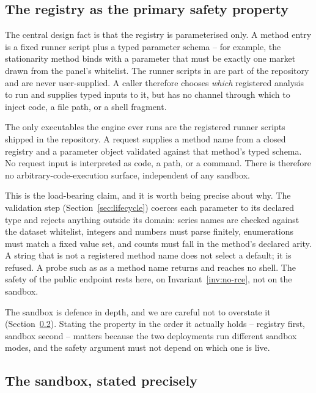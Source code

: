 \subsection{The registry as the primary safety property}
\label{sec:registry-guard}

The central design fact is that the registry is parameterised only. A method entry
is a fixed runner script plus a typed parameter schema -- for example, the
stationarity method binds  with a  parameter that must be
exactly one market drawn from the panel's whitelist. The runner scripts in
 are part of the repository and are never user-supplied. A caller therefore
chooses \emph{which} registered analysis to run and supplies typed inputs to it, but
has no channel through which to inject code, a file path, or a shell fragment.

\begin{invariant}
\label{inv:no-rce}
The only executables the engine ever runs are the registered runner scripts shipped
in the repository. A request supplies a method name from a closed registry and a
parameter object validated against that method's typed schema. No request input is
interpreted as code, a path, or a command. There is therefore no
arbitrary-code-execution surface, independent of any sandbox.
\end{invariant}

This is the load-bearing claim, and it is worth being precise about why. The
validation step (Section~\ref{sec:lifecycle}) coerces each parameter to its declared
type and rejects anything outside its domain: series names are checked against the
dataset whitelist, integers and numbers must parse finitely, enumerations must match
a fixed value set, and counts must fall in the method's declared arity. A string that
is not a registered method name does not select a default; it is refused. A probe
such as  as a method name returns  and reaches no shell. The safety of the public endpoint rests here, on
Invariant~\ref{inv:no-rce}, not on the sandbox.

The sandbox is defence in depth, and we are careful not to overstate it
(Section~\ref{sec:sandbox}). Stating the property in the order it actually holds --
registry first, sandbox second -- matters because the two deployments run different
sandbox modes, and the safety argument must not depend on which one is live.

\subsection{The sandbox, stated precisely}
\label{sec:sandbox}


